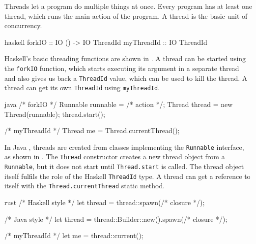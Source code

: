Threads let a program do multiple things at once.  Every program has
at least one thread, which runs the main action of the program.  A
thread is the basic unit of concurrency.

\begin{listing}
\centering
\begin{cminted}{haskell}
forkIO     :: IO () -> IO ThreadId
myThreadId :: IO ThreadId
\end{cminted}
\caption{Basic threading operations in Haskell.}\label{lst:basic_haskell}
\end{listing}

Haskell's basic threading functions are shown in
.  A thread can be started using the
\verb|forkIO| function, which starts executing its argument in a
separate thread and also gives us back a \verb|ThreadId| value, which
can be used to kill the thread.  A thread can get its own
\verb|ThreadId| using \verb|myThreadId|.

\begin{listing}
\centering
\begin{cminted}{java}
/* forkIO */
Runnable runnable = /* action */;
Thread thread = new Thread(runnable);
thread.start();

/* myThreadId */
Thread me = Thread.currentThread();
\end{cminted}
\caption{Basic threading operations in Java.}\label{lst:basic_java}
\end{listing}

In Java \parencite{lea1996}, threads are created from classes implementing
the \verb|Runnable| interface, as shown in .  The
\verb|Thread| constructor creates a new thread object from a
\verb|Runnable|, but it does not start until \verb|Thread.start| is
called.  The thread object itself fulfils the role of the Haskell
\verb|ThreadId| type.  A thread can get a reference to itself with the
\verb|Thread.currentThread| static method.

\begin{listing}
\centering
\begin{cminted}{rust}
/* Haskell style */
let thread = thread::spawn(/* closure */);

/* Java style */
let thread = thread::Builder::new().spawn(/* closure */);

/* myThreadId */
let me = thread::current();
\end{cminted}
\caption{Basic threading operations in Rust.}\label{lst:basic_rust}
\end{listing}

